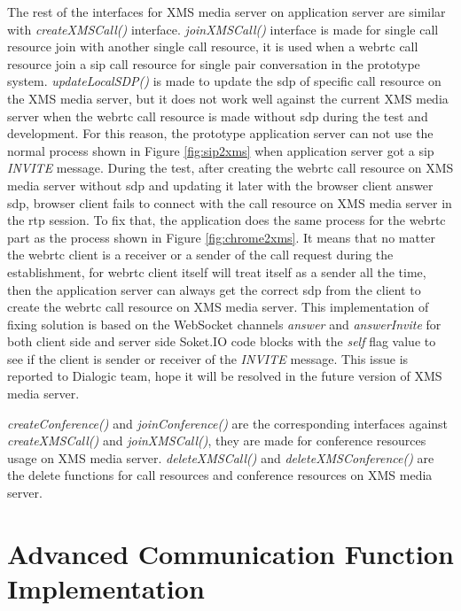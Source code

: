 \par The rest of the interfaces for XMS media server on application server are similar with \textit{createXMSCall()} interface. \textit{joinXMSCall()} interface is made for single call resource join with another single call resource, it is used when a \gls{webrtc} call resource join a \gls{sip} call resource for single pair conversation in the prototype system. \textit{updateLocalSDP()} is made to update the \gls{sdp} of specific call resource on the XMS media server, but it does not work well against the current XMS media server when the \gls{webrtc} call resource is made without \gls{sdp} during the test and development. For this reason, the prototype application server can not use the normal process shown in Figure \ref{fig:sip2xms} when application server got a \gls{sip} \textit{INVITE} message. During the test, after creating the \gls{webrtc} call resource on XMS media server without \gls{sdp} and updating it later with the browser client answer \gls{sdp}, browser client fails to connect with the call resource on XMS media server in the \gls{rtp} session. To fix that, the application does the same process for the \gls{webrtc} part as the process shown in Figure \ref{fig:chrome2xms}. It means that no matter the \gls{webrtc} client is a receiver or a sender of the call request during the establishment, for \gls{webrtc} client itself will treat itself as a sender all the time, then the application server can always get the correct \gls{sdp} from the client to create the \gls{webrtc} call resource on XMS media server. This implementation of fixing solution is based on the WebSocket channels \textit{answer} and \textit{answerInvite} for both client side and server side Soket.IO code blocks with the \textit{self} flag value to see if the client is sender or receiver of the \textit{INVITE} message. This issue is reported to Dialogic team, hope it will be resolved in the future version of XMS media server.

\par \textit{createConference()} and \textit{joinConference()} are the corresponding interfaces against \textit{createXMSCall()} and \textit{joinXMSCall()}, they are made for conference resources usage on XMS media server. \textit{deleteXMSCall()} and \textit{deleteXMSConference()} are the delete functions for call resources and conference resources on XMS media server.

\section{Advanced Communication Function Implementation}


